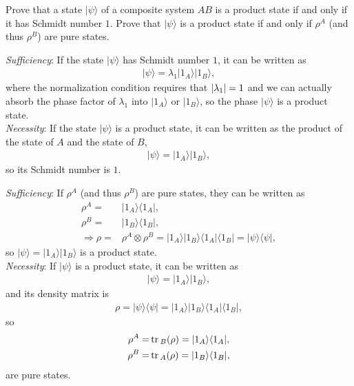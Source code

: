 \documentclass[en]{sol-man}
\begin{document}
\begin{exe}
    Prove that a state $\lvert\psi\rangle$ of a composite system $AB$ is a product state if and only if it has Schmidt number $1$. Prove that $\lvert\psi\rangle$ is a product state if and only if $\rho^A$ (and thus $\rho^B$) are pure states.
\end{exe}
\begin{pf}
    \emph{Sufficiency}: If the state $\lvert\psi\rangle$ has Schmidt number $1$, it can be written as
    \begin{align}
        \lvert\psi\rangle=\lambda_1\lvert 1_A\rangle\lvert 1_B\rangle,
    \end{align}
    where the normalization condition requires that $\left\lvert\lambda_1\right\rvert=1$ and we can actually absorb the phase factor of $\lambda_1$ into $\lvert 1_A\rangle$ or $\lvert 1_B\rangle$, so the phase $\lvert\psi\rangle$ is a product state.\\
    \emph{Necessity}: If the state $\lvert\psi\rangle$ is a product state, it can be written as the product of the state of $A$ and the state of $B$,
    \begin{align}
        \lvert\psi\rangle=\lvert 1_A\rangle\lvert 1_B\rangle,
    \end{align}
    so its Schmidt number is $1$.

    \emph{Sufficiency}: If $\rho^A$ (and thus $\rho^B$) are pure states, they can be written as
    \begin{align}
        \rho^A=&\lvert 1_A\rangle\langle 1_A\rvert,\\
        \rho^B=&\lvert 1_B\rangle\langle 1_B\rvert,\\
        \Longrightarrow\rho=&\rho^A\otimes\rho^B=\lvert 1_A\rangle\lvert 1_B\rangle\langle 1_A\rvert\langle 1_B\rvert=\lvert\psi\rangle\langle\psi\rvert,
    \end{align}
    so $\lvert\psi\rangle=\lvert 1_A\rangle\lvert 1_B\rangle$ is a product state.\\
    \emph{Necessity}: If $\lvert\psi\rangle$ is a product state, it can be written as
    \begin{align}
        \lvert\psi\rangle=\lvert 1_A\rangle\lvert 1_B\rangle,
    \end{align}
    and its density matrix is
    \begin{align}
        \rho=\lvert\psi\rangle\langle\psi\rvert=\lvert 1_A\rangle\lvert 1_B\rangle\langle 1_A\rvert\langle 1_B\rvert,
    \end{align}
    so
    \begin{align}
        \rho^A=&\,\mathrm{tr}\,_B(\rho)=\lvert 1_A\rangle\langle 1_A\rvert,\\
        \rho^B=&\,\mathrm{tr}\,_A(\rho)=\lvert 1_B\rangle\langle 1_B\rvert,
    \end{align}
    are pure states.
\end{pf}
\end{document}
